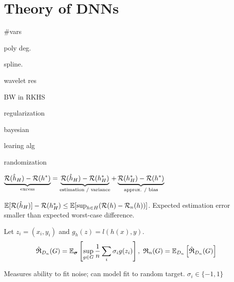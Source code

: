 \section{Theory of DNNs}
\begin{definition}
    \begin{itemize*}
        \item \#vars
        \item poly deg.
        \item spline.
        \item wavelet res
        \item BW in RKHS
    \end{itemize*}
\end{definition}

\begin{definition}
    \begin{itemize*}
        \item regularization
        \item bayesian
        \item learing alg
        \item randomization
    \end{itemize*}
\end{definition}

\begin{definition}[Risks]
    \(\underbrace{\mathcal{R}(\hat{h}_H) - \mathcal{R}(h^{*})}_{\text{excess}} = \underbrace{\mathcal{R}(\hat{h}_H) - \mathcal{R}(h_{H}^{*})}_{\text{estimation / variance}} + \underbrace{\mathcal{R}(h_{H}^{*}) - \mathcal{R}(h^{*})}_{\text{approx. / bias}}\)
\end{definition}

\begin{theorem}[ERM]
    \(\mathbb{E}[\mathcal{R}(\hat{h}_H)] - \mathcal{R}(h_{H}^{*}) \leq \mathbb{E}[\sup_{h \in H}(\mathcal{R}(h) - \mathcal{R}_n(h))]\). Expected estimation error smaller than expected worst-case difference.
\end{theorem}


\begin{definition}
    Let \(z_i = (x_i, y_i)\) and \(g_h(z) = l(h(x), y)\).
    \[\hat{\mathfrak{R}}_{D_n}(G) = \mathbb{E}_{\vb*{\sigma}}\left[\sup_{g \in G} \frac 1 n \sum_{i} \sigma_i g(z_i)\right], \
    \mathfrak{R}_n(G) = \mathbb{E}_{D_n}\left[\hat{\mathfrak{R}}_{D_n}(G)\right]\]

    Measures ability to fit noise; can model fit to random target. \(\sigma_i \in \{-1, 1\}\)
\end{definition}

